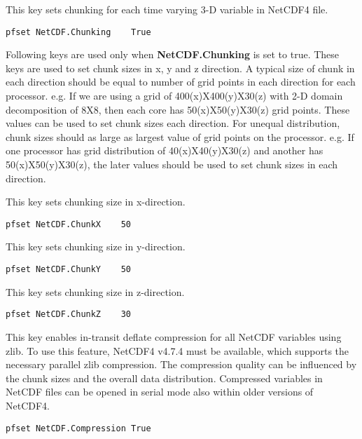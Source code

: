 {This key sets chunking for each time varying 3-D variable in NetCDF4 file.}
\begin{display}\begin{verbatim}
pfset NetCDF.Chunking    True
\end{verbatim}\end{display}

Following keys are used only when \textbf{NetCDF.Chunking} is set to true. These keys are used to set chunk sizes in x, y and z direction. A typical size of chunk in each direction should be equal to number of grid points in each direction for each processor. e.g. If we are using a grid of 400(x)X400(y)X30(z) with 2-D domain decomposition of 8X8, then each core has 50(x)X50(y)X30(z) grid points. These values can be used to set chunk sizes each direction. For unequal distribution, chunk sizes should as large as largest value of grid points on the processor. e.g. If one processor has grid distribution of 40(x)X40(y)X30(z) and another has 50(x)X50(y)X30(z), the later values should be used to set chunk sizes in each direction.

{This key sets chunking size in x-direction.}
\begin{display}\begin{verbatim}
pfset NetCDF.ChunkX    50
\end{verbatim}\end{display}

{This key sets chunking size in y-direction.}
\begin{display}\begin{verbatim}
pfset NetCDF.ChunkY    50
\end{verbatim}\end{display}

{This key sets chunking size in z-direction.}
\begin{display}\begin{verbatim}
pfset NetCDF.ChunkZ    30
\end{verbatim}\end{display}

{This key enables in-transit deflate compression for all NetCDF variables using zlib. To use this feature, NetCDF4 v4.7.4 must be available, which supports the necessary parallel zlib compression. The compression quality can be influenced by the chunk sizes and the overall data distribution. Compressed variables in NetCDF files can be opened in serial mode also within older versions of NetCDF4.}
\begin{display}\begin{verbatim}
pfset NetCDF.Compression True
\end{verbatim}\end{display}

